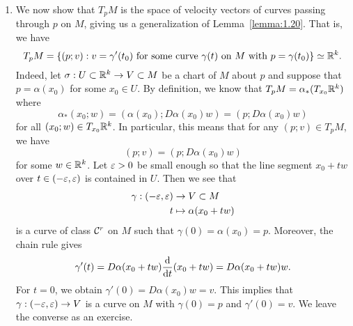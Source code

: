\begin{enumerate}[(1)]
    \item We now show that $T_pM$ is the space of velocity vectors of 
    curves passing through $p$ on $M$, giving us a generalization of 
    Lemma~\ref{lemma:1.20}. That is, we have 
    \[ T_pM = \{(p; v) : \text{$v = \gamma'(t_0)$ for some curve $\gamma(t)$ 
    on $M$ with $p = \gamma(t_0)$}\} \simeq \mathbb{R}^k. \] 
    Indeed, let $\sigma : U \subset \mathbb{R}^k \to V \subset M$ be a chart of $M$ 
    about $p$ and suppose that $p = \alpha(x_0)$ for some $x_0 \in U$. 
    By definition, we know that $T_pM = \alpha_*(T_{x_0}\mathbb{R}^k)$ where 
    \[ \alpha_*(x_0; w) = (\alpha(x_0); D\alpha(x_0)w) = 
    (p; D\alpha(x_0)w) \] 
    for all $(x_0; w) \in T_{x_0}\mathbb{R}^k$. In particular, this means that 
    for any $(p; v) \in T_pM$, we have 
    \[ (p; v) = (p; D\alpha(x_0)w) \] 
    for some $w \in \mathbb{R}^k$. Let $\varepsilon > 0$ be small enough so that the 
    line segment $x_0 + tw$ over $t \in (-\varepsilon, \varepsilon)$ is contained in $U$. 
    Then we see that 
    \begin{align*}
        \gamma : (-\varepsilon, \varepsilon) &\to V \subset M \\ 
        t &\mapsto \alpha(x_0 + tw) 
    \end{align*}
    is a curve of class ${\cal C}^r$ on $M$ such that $\gamma(0) = \alpha(x_0) = p$. 
    Moreover, the chain rule gives 
    \[ \gamma'(t) = D\alpha(x_0 + tw) \frac{\rm d}{{\rm d}t}(x_0 + tw) = D\alpha(x_0 + tw) w. \] 
    For $t = 0$, we obtain $\gamma'(0) = D\alpha(x_0)w = v$. This implies 
    that $\gamma : (-\varepsilon, \varepsilon) \to V$ is a curve on $M$ with $\gamma(0) = p$ 
    and $\gamma'(0) = v$. We leave the converse as an exercise.
\end{enumerate}

